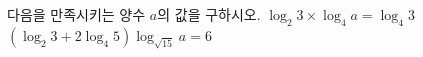 다음을 만족시키는 양수 $a$의 값을 구하시오.
 $\log_2 3\times\log_4 a=\log_4 3$
 $(\log_2 3+2\log_4 5)\log_{\sqrt{15}} a=6$
